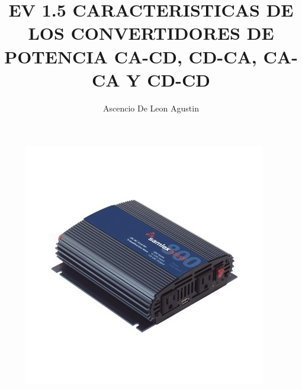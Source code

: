 \documentclass[10pt,letterpaper]{article}
\title{EV 1.5 CARACTERISTICAS DE LOS CONVERTIDORES DE POTENCIA CA-CD, CD-CA, CA-CA Y CD-CD}
\author{Ascencio De Leon Agustin}
\begin{document}
\maketitle
\begin{figure}[h!]
\centering
\includegraphics[scale=.9]{cacD}
\end{figure}
\newpage
\end{document}

